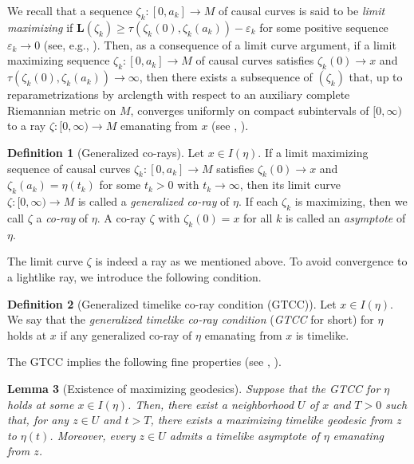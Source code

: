 \documentclass[a4paper,11pt]{article}
\numberwithin{equation}{section}
\theoremstyle{definition}
\newtheorem{definition}{Definition}[section]
\theoremstyle{plain}
\newtheorem{lemma}[definition]{Lemma}
\newcommand{\ve}{\varepsilon}
\newcommand{\lra}{\longrightarrow}
\newcommand{\bL}{\ensuremath{\mathbf{L}}}
\begin{document}
We recall that a sequence $\zeta_k \colon [0,a_k] \lra M$ of causal curves is said to be {\em limit maximizing} if
$\bL(\zeta_k)\geq \tau(\zeta_k(0), \zeta_k(a_k)) - \ve_k$ for some positive sequence $\ve_k \to 0$ (see, e.g., \cite[p.~210]{EG}).
Then, as a consequence of a limit curve argument, if a limit maximizing sequence $\zeta_k\colon [0,a_k] \lra M$ of causal curves satisfies $\zeta_k(0)\to x$ and $\tau(\zeta_k(0),\zeta_k(a_k)) \to \infty$, then there exists a subsequence of $(\zeta_k)$ that, up to  reparametrizations by arclength with respect to an auxiliary complete Riemannian metric on $M$, converges uniformly on compact subintervals of $[0,\infty)$ to a ray $\zeta\colon [0,\infty) \lra M$ emanating from $x$ (see  \cite[Lemma~4.4]{LMO3}, \cite[Lemma~2.4]{GH}).
\begin{definition}[Generalized co-rays]\label{df:coray}
Let $x \in I(\eta)$.
If a limit maximizing sequence of causal curves $\zeta_k\colon [0,a_k] \lra M$ satisfies
$\zeta_k(0) \to x$ and $\zeta_k(a_k)=\eta(t_k)$ for some $t_k>0$ with $t_k \to \infty$,
then its limit curve $\zeta\colon [0,\infty) \lra M$ is called a \emph{generalized co-ray} of $\eta$.
If each $\zeta_k$ is maximizing, then we call $\zeta$ a \emph{co-ray} of $\eta$.
A co-ray $\zeta$ with $\zeta_k(0)=x$ for all $k$ is called an \emph{asymptote} of $\eta$.
\end{definition}

The limit curve $\zeta$ is indeed a ray as we mentioned above.
To avoid convergence to a lightlike ray, we introduce the following condition.

\begin{definition}[Generalized timelike co-ray condition (GTCC)]\label{df:GTCC}
Let $x \in I(\eta)$.
We say that the \emph{generalized timelike co-ray condition}
(\emph{GTCC} for short) for $\eta$ holds at $x$
if any generalized co-ray of $\eta$ emanating from $x$ is timelike.
\end{definition}

The GTCC implies the following fine properties (see \cite[Lemmas~4.8, 4.9]{LMO3}, \cite[Lemmas~3.3, 3.4]{GH}).

\begin{lemma}[Existence of maximizing geodesics]\label{lm:GH3.3}
Suppose that the GTCC for $\eta$ holds at some $x \in I(\eta)$.
Then, there exist a neighborhood $U$ of $x$ and $T>0$ such that, for any $z \in U$ and $t>T$, there exists a maximizing timelike geodesic from $z$ to $\eta(t)$.
Moreover, every $z \in U$ admits a timelike asymptote of $\eta$ emanating from $z$.
\end{lemma}
\end{document}
